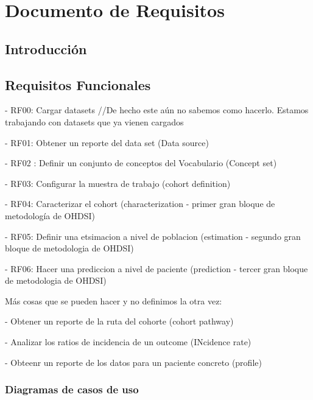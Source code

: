 \chapter{Documento de Requisitos}\label{cap:06requisitos}

\section{Introducción}




\section{Requisitos Funcionales}

- RF00: Cargar datasets //De hecho este aún no sabemos como hacerlo. Estamos trabajando con datasets que ya vienen cargados

- RF01: Obtener un reporte del data set (Data source)

- RF02 : Definir un conjunto de conceptos del Vocabulario (Concept set)

- RF03: Configurar la muestra de trabajo (cohort definition)

- RF04: Caracterizar el cohort (characterization - primer gran bloque de metodología de OHDSI)

- RF05: Definir una etsimacion a nivel de poblacion (estimation - segundo gran bloque de metodologia de OHDSI)

- RF06: Hacer una prediccion a nivel de paciente (prediction - tercer gran bloque de metodologia de OHDSI)



Más cosas que se pueden hacer y no definimos la otra vez:

- Obtener un reporte de la ruta del cohorte (cohort pathway)

- Analizar los ratios de incidencia de un outcome (INcidence rate)

- Obteenr un reporte de los datos para un paciente concreto (profile)

\subsection{Diagramas de casos de uso}


